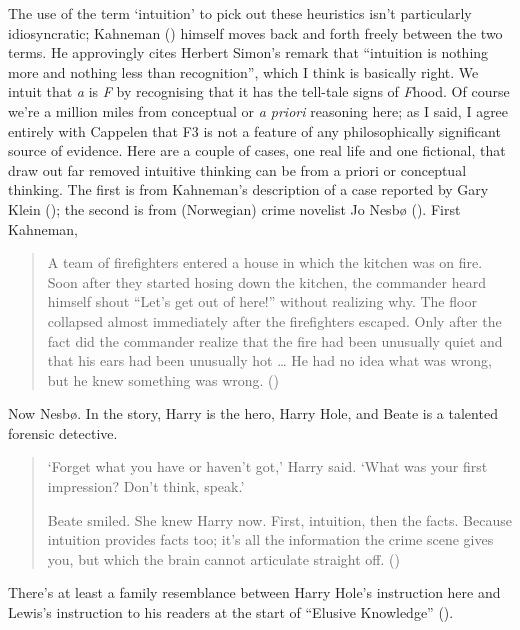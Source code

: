 \documentclass[
  10pt,
  letterpaper,
  DIV=11,
  numbers=noendperiod,
  twoside]{scrartcl}
\begin{document}
The use of the term `intuition' to pick out these heuristics isn't
particularly idiosyncratic; Kahneman ()
himself moves back and forth freely between the two terms. He
approvingly cites Herbert Simon's remark that ``intuition is nothing
more and nothing less than recognition'', which I think is basically
right. We intuit that \emph{a} is \emph{F} by recognising that it has
the tell-tale signs of \emph{F}hood. Of course we're a million miles
from conceptual or \emph{a priori} reasoning here; as I said, I agree
entirely with Cappelen that F3 is not a feature of any philosophically
significant source of evidence. Here are a couple of cases, one real
life and one fictional, that draw out far removed intuitive thinking can
be from a priori or conceptual thinking. The first is from Kahneman's
description of a case reported by Gary Klein
(); the second is from (Norwegian) crime
novelist Jo Nesbø (). First Kahneman,

\begin{quote}
A team of firefighters entered a house in which the kitchen was on fire.
Soon after they started hosing down the kitchen, the commander heard
himself shout ``Let's get out of here!'' without realizing why. The
floor collapsed almost immediately after the firefighters escaped. Only
after the fact did the commander realize that the fire had been
unusually quiet and that his ears had been unusually hot \ldots{} He had
no idea what was wrong, but he knew something was wrong.
()
\end{quote}

Now Nesbø. In the story, Harry is the hero, Harry Hole, and Beate is a
talented forensic detective.

\begin{quote}
`Forget what you have or haven't got,' Harry said. `What was your first
impression? Don't think, speak.'

Beate smiled. She knew Harry now. First, intuition, then the facts.
Because intuition provides facts too; it's all the information the crime
scene gives you, but which the brain cannot articulate straight off.
()
\end{quote}

There's at least a family resemblance between Harry Hole's instruction
here and Lewis's instruction to his readers at the start of ``Elusive
Knowledge'' ().
\end{document}
